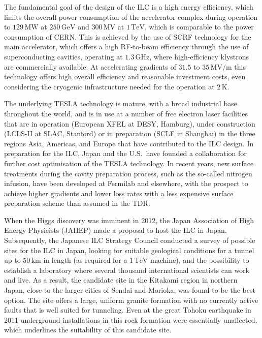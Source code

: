 \documentclass[%
 reprint,
 amsmath,amssymb,
 aps,
]{revtex4-1}
\begin{document}
The fundamental goal of the design of the ILC is a high energy efficiency, which limits the overall power consumption of the accelerator complex during operation to $129\,{\mathrm{MW}}$ at  $250\,{\mathrm{GeV}}$ and $300\,{\mathrm{MV}}$ at  $1\,{\mathrm{TeV}}$, which is comparable to the power consumption of CERN.
This is achieved by the use of SCRF technology for the main accelerator, which offers a high RF-to-beam efficiency through the use of superconducting cavities, operating at $1.3\,{\mathrm{GHz}}$, where high-efficiency klystrons are commercially available.
At accelerating gradients of $31.5$ to $35\,{\mathrm{MV/m}}$ this technology offers high overall efficiency and reasonable investment costs, even considering the cryogenic infrastructure needed for the operation at $2\,{\mathrm{K}}$.

The underlying TESLA technology is mature, with a broad industrial base throughout the world, and is in use at a number of free electron laser facilities that are in operation (European XFEL at DESY, Hamburg), under construction (LCLS-II at SLAC, Stanford) or in preparation (SCLF in Shanghai) in the three regions Asia, Americas, and Europe that have contributed to the ILC design.
In preparation for the ILC, Japan and the U.S.\ have founded a collaboration for further cost optimisation of the TESLA technology.
In recent years, new surface treatments during the cavity preparation process, such as the so-called nitrogen infusion, have been developed at Fermilab and elsewhere, with the prospect to achieve higher gradients and lower loss rates with a less expensive surface preparation scheme than assumed in the TDR.

When the Higgs discovery was imminent in 2012, the Japan Association of High Energy Physicists (JAHEP) made a proposal to host the ILC in Japan. 
Subsequently, the Japanese ILC Strategy Council conducted a survey of possible sites for the ILC in Japan, looking for  suitable geological conditions for a tunnel up to $50\,{\mathrm{km}}$ in length (as required for a $1\,{\mathrm{TeV}}$  machine), and the possibility to establish a laboratory where several thousand international scientists can work and live. 
As a result, the candidate site in the Kitakami region in northern Japan, close to the larger cities of Sendai and Morioka, was found to be the best option. 
The site offers a large, uniform granite formation with no currently active faults that is well suited for tunneling.
Even at the great Tohoku earthquake in 2011 underground installations in this rock formation were essentially unaffected, which underlines the suitability of this candidate site. 
\end{document}
